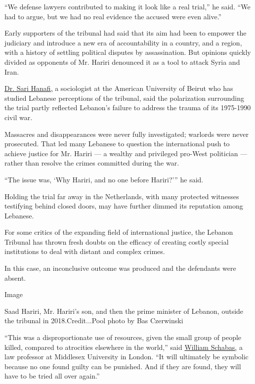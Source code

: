 ``We defense lawyers contributed to making it look like a real trial,''
he said. ``We had to argue, but we had no real evidence the accused were
even alive.''

Early supporters of the tribunal had said that its aim had been to
empower the judiciary and introduce a new era of accountability in a
country, and a region, with a history of settling political disputes by
assassination. But opinions quickly divided as opponents of Mr. Hariri
denounced it as a tool to attack Syria and Iran.

\href{https://www.aub.edu.lb/fas/soam/soan/Pages/Sari-Hanafi.aspx}{Dr.
Sari Hanafi,} a sociologist at the American University of Beirut who has
studied Lebanese perceptions of the tribunal, said the polarization
surrounding the trial partly reflected Lebanon's failure to address the
trauma of its 1975-1990 civil war.

Massacres and disappearances were never fully investigated; warlords
were never prosecuted. That led many Lebanese to question the
international push to achieve justice for Mr. Hariri --- a wealthy and
privileged pro-West politician --- rather than resolve the crimes
committed during the war.

``The issue was, `Why Hariri, and no one before Hariri?''' he said.

Holding the trial far away in the Netherlands, with many protected
witnesses testifying behind closed doors, may have further dimmed its
reputation among Lebanese.

For some critics of the expanding field of international justice, the
Lebanon Tribunal has thrown fresh doubts on the efficacy of creating
costly special institutions to deal with distant and complex crimes.

In this case, an inconclusive outcome was produced and the defendants
were absent.

Image

Saad Hariri, Mr. Hariri's son, and then the prime minister of Lebanon,
outside the tribunal in 2018.Credit...Pool photo by Bas Czerwinski

``This was a disproportionate use of resources, given the small group of
people killed, compared to atrocities elsewhere in the world,'' said
\href{https://www.mdx.ac.uk/about-us/our-people/staff-directory/profile/schabas-william}{William
Schabas,} a law professor at Middlesex University in London. ``It will
ultimately be symbolic because no one found guilty can be punished. And
if they are found, they will have to be tried all over again.''

